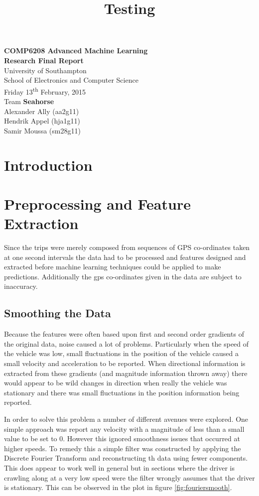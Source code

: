 \documentclass[11pt, a4paper, titlepage]{article}
\title{Testing}
\begin{document}
\begin{center}
{\Large \textbf{COMP6208 Advanced Machine Learning\\Research Final Report}}\\
\vspace{0.7cm}
University of Southampton\\
School of Electronics and Computer Science\\
Friday 13\textsuperscript{th} February, 2015\\
\vspace{0.7cm}
Team \textbf{{\large Seahorse}}\\
Alexander Ally (aa2g11)\\
Hendrik Appel (hja1g11)\\
Samir Moussa (sm28g11)
\end{center}

\section{Introduction}

\section{Preprocessing and Feature Extraction}
Since the trips were merely composed from sequences of GPS co-ordinates taken at one second intervals the data had to be processed and features designed and extracted before machine learning techniques could be applied to make predictions. Additionally the gps co-ordinates given in the data are subject to inaccuracy. 

\subsection{Smoothing the Data}
Because the features were often based upon first and second order gradients of the original data, noise caused a lot of problems. Particularly when the speed of the vehicle was low, small fluctuations in the position of the vehicle caused a small velocity and acceleration to be reported. When directional information is extracted from these gradients (and magnitude information thrown away) there would appear to be wild changes in direction when really the vehicle was stationary and there was small fluctuations in the position information being reported. 

In order to solve this problem a number of different avenues were explored. One simple approach was report any velocity with a magnitude of less than a small value to be set to 0. However this ignored smoothness issues that occurred at higher speeds. To remedy this a simple filter was constructed by applying the Discrete Fourier Transform and reconstructing th data using fewer components. This does appear to work well in general but in sections where the driver is crawling along at a very low speed were the filter wrongly assumes that the driver is stationary. This can be observed in the plot in figure \ref{fig:fouriersmooth}.
\end{document}
